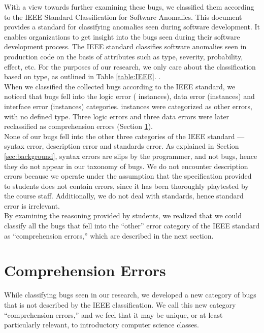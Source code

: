 \documentclass{sig-alternate}
\begin{document}
With a view towards further examining these bugs, we classified them
according to the IEEE Standard Classification for Software Anomalies.
This document provides a standard for classifying anomalies seen
during software development. It enables organizations to get insight
into the bugs seen during their software development process. The IEEE
standard classifies software anomalies seen in production code on the
basis of attributes such as type, severity, probability, effect, etc.
For the purposes of our research, we only care about the
classification based on type, as outlined in Table \ref{table:IEEE}.
\cite{IEEE10}.\\

When we classified the collected bugs according to the IEEE standard,
we noticed that bugs fell into the logic error (\numlogicIEEE
instances), data error (\numdataIEEE instances) and interface error
(\numinterfaceIEEE instances) categories. \numotherIEEE instances were
categorized as other errors, with no defined type. Three logic errors
and three data errors were later reclassified as comprehension errors
(Section \ref{sec:comprehension}).\\

None of our bugs fell into the other three categories of the IEEE
standard --- syntax error, description error and standards error. As
explained in Section \ref{sec:background}, syntax errors are slips by
the programmer, and not bugs, hence they do not appear in our taxonomy
of bugs. We do not encounter description errors because we operate
under the assumption that the specification provided to students does
not contain errors, since it has been thoroughly playtested by the
course staff. Additionally, we do not deal with standards, hence
standard error is irrelevant.\\

By examining the reasoning provided by students, we realized that we
could classify all the bugs that fell into the ``other'' error
category of the IEEE standard as ``comprehension errors,'' which are
described in the next section.

\section{Comprehension Errors}
\label{sec:comprehension}

While classifying bugs seen in our research, we developed a new
category of bugs that is not described by the IEEE classification. We
call this new category ``comprehension errors,'' and we feel that it
may be unique, or at least particularly relevant, to introductory
computer science classes.\\
\end{document}
